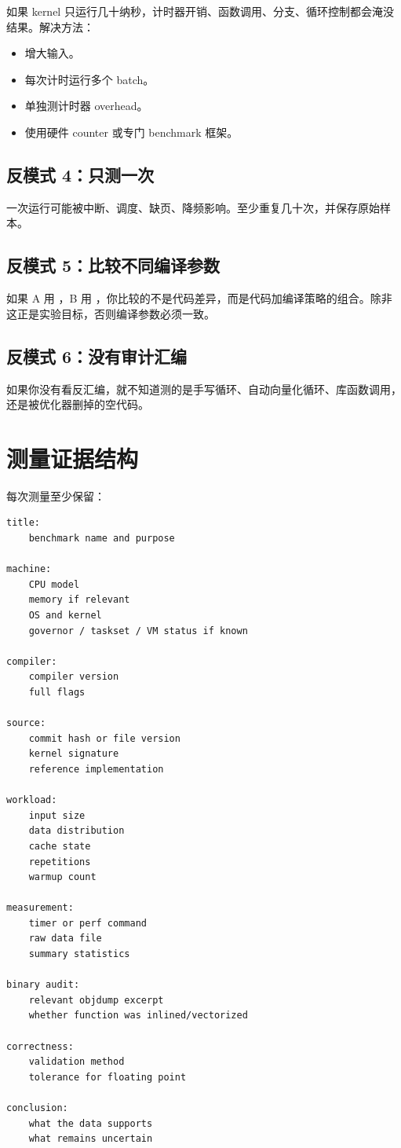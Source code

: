 如果 kernel 只运行几十纳秒，计时器开销、函数调用、分支、循环控制都会淹没结果。解决方法：

\begin{itemize}
  \item 增大输入。
  \item 每次计时运行多个 batch。
  \item 单独测计时器 overhead。
  \item 使用硬件 counter 或专门 benchmark 框架。
\end{itemize}

\subsection{反模式 4：只测一次}

一次运行可能被中断、调度、缺页、降频影响。至少重复几十次，并保存原始样本。

\subsection{反模式 5：比较不同编译参数}

如果 A 用 ，B 用 ，你比较的不是代码差异，而是代码加编译策略的组合。除非这正是实验目标，否则编译参数必须一致。

\subsection{反模式 6：没有审计汇编}

如果你没有看反汇编，就不知道测的是手写循环、自动向量化循环、库函数调用，还是被优化器删掉的空代码。

\section{测量证据结构}

每次测量至少保留：

\begin{lstlisting}
title:
    benchmark name and purpose

machine:
    CPU model
    memory if relevant
    OS and kernel
    governor / taskset / VM status if known

compiler:
    compiler version
    full flags

source:
    commit hash or file version
    kernel signature
    reference implementation

workload:
    input size
    data distribution
    cache state
    repetitions
    warmup count

measurement:
    timer or perf command
    raw data file
    summary statistics

binary audit:
    relevant objdump excerpt
    whether function was inlined/vectorized

correctness:
    validation method
    tolerance for floating point

conclusion:
    what the data supports
    what remains uncertain
\end{lstlisting}

